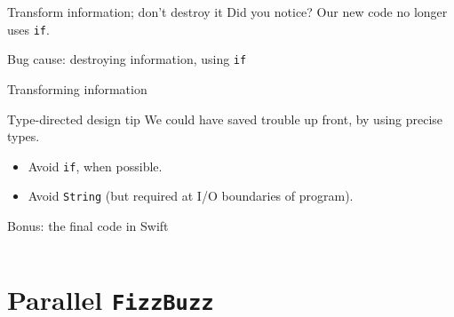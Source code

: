 \begin{frame}[fragile]{Transform information; don't destroy it}
  Did you notice? Our new code no longer uses \texttt{if}.

  \begin{block}{Bug cause: destroying information, using \texttt{if}} 
  \end{block}

  \begin{block}{Transforming information}
  \end{block}

  \begin{block}{Type-directed design tip}
    We could have saved trouble \alert{up front}, by using precise \alert{types}.
    \begin{itemize}
    \item Avoid \texttt{if}, when possible.
    \item Avoid \texttt{String} (but required at I/O boundaries of program).
    \end{itemize}
  \end{block}
\end{frame}

\begin{frame}[fragile]{Bonus: the final code in Swift}
  \inputminted{swift}{FizzBuzzFinal.swift}
\end{frame}


\section{Parallel \texttt{FizzBuzz}}

